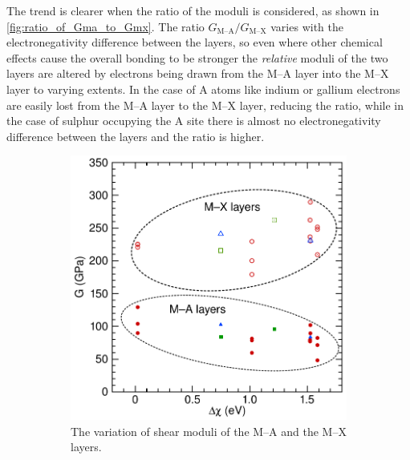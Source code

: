 The trend is clearer when the ratio of the moduli is considered, as shown in \autoref{fig:ratio_of_Gma_to_Gmx}. The ratio $G_{\text{M--A}}/G_{\text{M--X}}$ varies with the electronegativity difference between the layers, so even where other chemical effects cause the overall bonding to be stronger the \emph{relative} moduli of the two layers are altered by electrons being drawn from the M--A layer into the M--X layer to varying extents. In the case of A atoms like indium or gallium electrons are easily lost from the M--A layer to the M--X layer, reducing the ratio, while in the case of sulphur occupying the A site there is almost no electronegativity difference between the layers and the ratio is higher.


\begin{figure}
\centering

\begin{subfigure}{0.4\textwidth}
\centering
{}
\includegraphics[width=\textwidth]{Gmx_and_Gma_dX_MAX}
\caption{The variation of shear moduli of the M--A and the M--X layers.  \label{fig:Gma_variation}}
\end{subfigure}
~
\begin{subfigure}{0.4\textwidth}
\centering
{}

\end{subfigure}
\end{figure}
